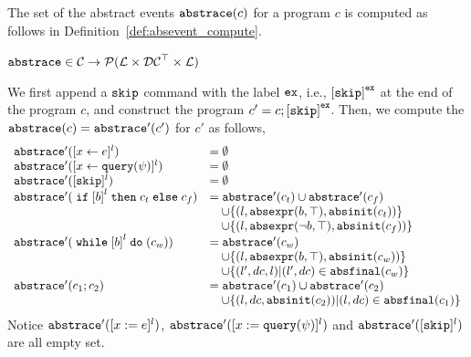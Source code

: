The set of the abstract events $\mathtt{abs}{\mathtt{trace}}(c)$ for a program $c$
is computed as follows in Definition~\ref{def:absevent_compute}.
 \begin{defn}
 \label{def:absevent_compute}
 $\mathtt{abs}{\mathtt{trace}} \in \mathcal{C} \to \mathcal{P}( \mathcal{L} \times \mathcal{DC}^{\top} \times \mathcal{L} )$
 \end{defn}
 We first append a $\mathtt{skip}$ command with 
the label $\mathtt{ex}$, i.e., $\clabel{\eskip}^{\lex}$ at the end of the program $c$, and construct 
the program $c' = c;\clabel{\eskip}^{\lex}$.
Then, we compute the $\mathtt{abs}{\mathtt{trace}}(c) = \mathtt{abs}{\mathtt{trace}}'(c')$ for $c'$ as follows,
 {
 \[
 \begin{array}{ll}
 \absflow'(\clabel{\assign{x}{\expr}}{}^l) & = \emptyset \\
 \absflow'(\clabel{\assign{x}{\query(\qexpr)}}{}^l) & = \emptyset \\
 \absflow'([\eskip]^{l}) & = \emptyset \\
 \absflow'(\eif \clabel{\bexpr}^{l} \ethen c_t \eelse c_f) & = \absflow'(c_t) \cup \absflow'(c_f)
 \\ & \quad 
 \cup \left\{(l, \absexpr(\bexpr, \top), \absinit(c_t) ) \right\}
 \\ & \quad 
 \cup \left\{ (l, \absexpr(\neg\bexpr, \top), \absinit(c_f)) \right\} \\
 \absflow'(\ewhile \clabel{\bexpr}^{l} \edo (c_w)) & = \absflow'(c_w) 
 \\ & \quad \cup \{(l, \absexpr(\bexpr, \top), \absinit(c_w)) \} 
 \\ & \quad 
 \cup \{(l', dc, l)| (l', dc) \in \absfinal(c_w) \} \\
 \absflow'(c_1 ; c_2) & = \absflow'(c_1) \cup \absflow'(c_2) 
 \\ & \quad 
 \cup \{ (l, dc, \absinit(c_2)) | (l, dc) \in \absfinal(c_1) \} \\
 \end{array}
 \]
 }
 Notice $\mathtt{abs}{\mathtt{trace}}'([x := e]^{l})$, $\mathtt{abs}{\mathtt{trace}}'([x := {\tt query}(\psi)]^{l})$ and $\mathtt{abs}{\mathtt{trace}}'([\mathtt{skip}]^{l})$ are all empty set. 
 


